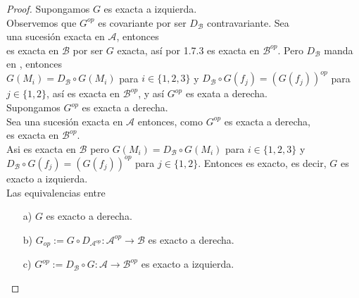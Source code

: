 \documentclass{article}
\begin{document}
\begin{enumerate}[label=\textbf{Ej \arabic*.}]
\begin{proof}
 Supongamos $G$ es exacta a izquierda.\\

Observemos que $G^{op}$ es covariante por ser $ D_{\mathscr{B}}$ contravariante. Sea  \\ 
 una sucesión exacta en $\mathscr{A}$, entonces \\
 es exacta en $\mathscr{B}$ por ser $G$ exacta, así por 1.7.3
es exacta en $\mathscr{B}^{op}$.
Pero $ D_{\mathscr{B}}$ manda  en , entonces \\$G(M_i)=D_{\mathscr{B}}\circ G(M_i)$
para $i\in \{1,2,3\}$ y $D_{\mathscr{B}}\circ G(f_j)=(G(f_j))^{op}$ para $j\in \{1,2\}$, así
 es exacta en $\mathscr{B}^{op}$, y así
$G^{op}$ es exata a derecha.\\

 Supongamos $G^{op}$ es exacta a derecha.\\

Sea  una sucesión exacta en $\mathscr{A}$ entonces, como $G^{op}$ es exacta a derecha,\\
 es exacta en $\mathscr{B}^{op}$. \\Asi 
{} es exacta en $\mathscr{B}$
pero $G(M_i)=D_{\mathscr{B}}\circ G(M_i)$ para $i\in \{1,2,3\}$ y $D_{\mathscr{B}}\circ G(f_j)=(G(f_j))^{op}$ para $j\in \{1,2\}$.
Entonces  es exacto, es decir, $G$ es exacto a izquierda.\\

 Las equivalencias entre 
\begin{itemize}
\item[a)] $G$ es exacto a derecha.
\item[b)] $G_{op}:=G\circ D_{\mathscr{A}^{op}}\colon\mathscr{A}^{op}\longrightarrow\mathscr{B}$ es exacto a derecha.
\item[c)] $G^{op}:= D_{\mathscr{B}}\circ G\colon\mathscr{A}\longrightarrow\mathscr{B}^{op}$ es exacto a izquierda.
\end{itemize}


\end{proof}
\end{enumerate}
\end{document}
